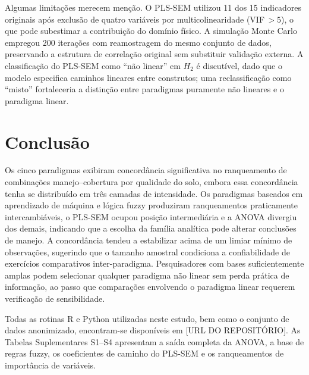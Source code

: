 \documentclass[pdflatex,sn-basic]{sn-jnl}%
\begin{document}
Algumas limitações merecem menção. O PLS-SEM utilizou 11 dos 15 indicadores originais após exclusão de quatro variáveis por multicolinearidade (VIF\,$> 5$), o que pode subestimar a contribuição do domínio físico. A simulação Monte Carlo empregou 200 iterações com reamostragem do mesmo conjunto de dados, preservando a estrutura de correlação original sem substituir validação externa. A classificação do PLS-SEM como ``não linear'' em $H_2$ é discutível, dado que o modelo especifica caminhos lineares entre construtos; uma reclassificação como ``misto'' fortaleceria a distinção entre paradigmas puramente não lineares e o paradigma linear.

\section{Conclusão}\label{sec:conclusion}

Os cinco paradigmas exibiram concordância significativa no ranqueamento de combinações manejo--cobertura por qualidade do solo, embora essa concordância tenha se distribuído em três camadas de intensidade. Os paradigmas baseados em aprendizado de máquina e lógica fuzzy produziram ranqueamentos praticamente intercambiáveis, o PLS-SEM ocupou posição intermediária e a ANOVA divergiu dos demais, indicando que a escolha da família analítica pode alterar conclusões de manejo. A concordância tendeu a estabilizar acima de um limiar mínimo de observações, sugerindo que o tamanho amostral condiciona a confiabilidade de exercícios comparativos inter-paradigma. Pesquisadores com bases suficientemente amplas podem selecionar qualquer paradigma não linear sem perda prática de informação, ao passo que comparações envolvendo o paradigma linear requerem verificação de sensibilidade.

\backmatter


Todas as rotinas R e Python utilizadas neste estudo, bem como o conjunto de dados anonimizado, encontram-se disponíveis em [URL DO REPOSITÓRIO]. As Tabelas Suplementares S1--S4 apresentam a saída completa da ANOVA, a base de regras fuzzy, os coeficientes de caminho do PLS-SEM e os ranqueamentos de importância de variáveis.


\end{document}
